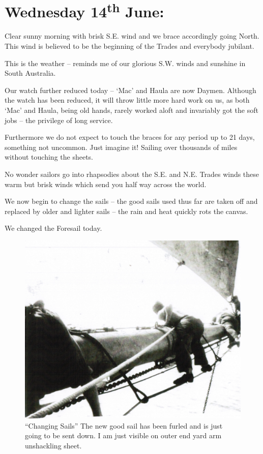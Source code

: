 \documentclass[
  11pt,
  msmallroyalvopaper
]{memoir}
\begin{document}
\hypertarget{wednesday-14th-june}{%
\section{\texorpdfstring{Wednesday 14\textsuperscript{th}
June:}{Wednesday 14th June:}}\label{wednesday-14th-june}}

Clear sunny morning with brisk S.E. wind and we brace accordingly going
North. This wind is believed to be the beginning of the Trades and
everybody jubilant.

This is the weather -- reminds me of our glorious S.W. winds and
sunshine in South Australia.

Our watch further reduced today -- `Mac' and Haula are now Daymen.
Although the watch has been reduced, it will throw little more hard work
on us, as both `Mac' and Haula, being old hands, rarely worked aloft and
invariably got the soft jobs -- the privilege of long service.

Furthermore we do not expect to touch the braces for any period up to 21
days, something not uncommon. Just imagine it! Sailing over thousands of
miles without touching the sheets.

No wonder sailors go into rhapsodies about the S.E. and N.E. Trades
winds these warm but brisk winds which send you half way across the
world.

We now begin to change the sails -- the good sails used thus far are
taken off and replaced by older and lighter sails -- the rain and heat
quickly rots the canvas.

We changed the Foresail today.

\begin{figure}
\centering
\includegraphics{./images/image019.png}
\caption{``Changing Sails'' The new good sail has been furled and is
just going to be sent down. I am just visible on outer end yard arm
unshackling sheet.}
\end{figure}
\end{document}

